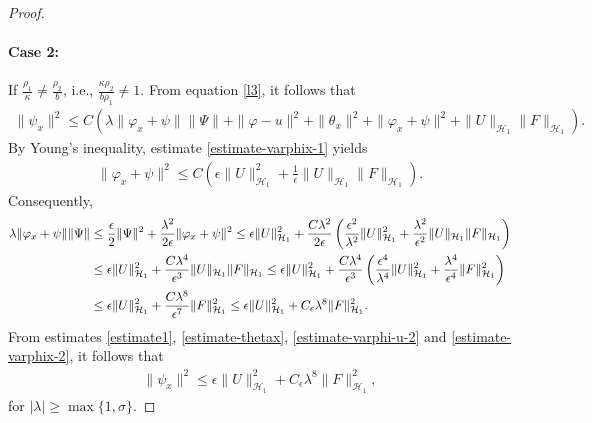 \documentclass[11pt,reqno]{article}
\begin{document}
\begin{proof}
  	\paragraph{Case 2:}If $\frac{\rho_1}{\kappa}\neq\frac{\rho_2}{b}$, i.e., $\frac{\kappa \rho_2}{b \rho_1} \neq 1$.
  	From equation \eqref{l3}, it follows that
  	\begin{align*}
  		\|\psi_x\|^2 \leq C \left(\lambda\|\varphi_x + \psi\|\|\Psi\| + \|\varphi-u\|^2 + \|\theta_x\|^2 + \|\varphi_x+\psi\|^2 + \|U\|_{\mathcal{H}_1} \|F\|_{\mathcal{H}_1}  \right).
  	\end{align*}
  	By Young's inequality, estimate \eqref{estimate-varphix-1} yields
  	\begin{align*}
  		\|\varphi_x + \psi\|^2 \leq C\left(\epsilon \|U\|_{\mathcal{H}_1}^2 + \frac{1}{\epsilon}\|U\|_{\mathcal{H}_1}\|F\|_{\mathcal{H}_1}\right).
  	\end{align*}
  	Consequently,
  	\begin{align}\label{estimate1}
  		\lambda\|\varphi_x + \psi\|\|\Psi\| &\leq \frac{\epsilon}{2}\|\Psi\|^2 + \frac{\lambda ^2}{2\epsilon} \|\varphi_x + \psi\|^2
  		\leq \epsilon \|U\|_{\mathcal{H}_1}^2 + \frac{C \lambda ^2}{2\epsilon}\left(\frac{\epsilon^2}{\lambda^2}\|U\|_{\mathcal{H}_1}^2 + \frac{\lambda^2}{\epsilon^2}\|U\|_{\mathcal{H}_1}\|F\|_{\mathcal{H}_1}\right) \notag\\
  		&\leq \epsilon \|U\|_{\mathcal{H}_1}^2 + \frac{C \lambda ^4}{\epsilon^3}\|U\|_{\mathcal{H}_1}\|F\|_{\mathcal{H}_1}
  		\leq \epsilon \|U\|_{\mathcal{H}_1}^2 + \frac{C \lambda ^4}{\epsilon^3}\left(\frac{\epsilon^4}{\lambda^4}\|U\|_{\mathcal{H}_1}^2 + \frac{\lambda^4}{\epsilon^4}\|F\|_{\mathcal{H}_1}^2\right) \notag\\
  		&\leq \epsilon \|U\|_{\mathcal{H}_1}^2 + \frac{C \lambda^8}{\epsilon^7}\|F\|_{\mathcal{H}_1}^2
  		\leq \epsilon \|U\|_{\mathcal{H}_1}^2 + C_{\epsilon}\lambda^8 \|F\|_{\mathcal{H}_1}^2.
  	\end{align}
  	From estimates \eqref{estimate1}, \eqref{estimate-thetax}, \eqref{estimate-varphi-u-2} and \eqref{estimate-varphix-2}, it follows that
  	\begin{align*}
  		\|\psi_x\|^2 \leq \epsilon \|U\|_{\mathcal{H}_1}^2 + C_{\epsilon} \lambda^8 \|F\|_{\mathcal{H}_1}^2,
  	\end{align*}
  	for $|\lambda| \geq \max\{1, \sigma\}$.
  \end{proof}
\end{document}
